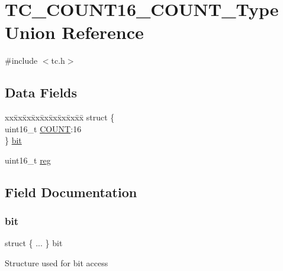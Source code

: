 \hypertarget{union_t_c___c_o_u_n_t16___c_o_u_n_t___type}{}\section{T\+C\+\_\+\+C\+O\+U\+N\+T16\+\_\+\+C\+O\+U\+N\+T\+\_\+\+Type Union Reference}
\label{union_t_c___c_o_u_n_t16___c_o_u_n_t___type}


{\ttfamily \#include $<$tc.\+h$>$}

\subsection*{Data Fields}
\begin{DoxyCompactItemize}
\item 
\begin{tabbing}
xx\=xx\=xx\=xx\=xx\=xx\=xx\=xx\=xx\=\kill
struct \{\\
\>uint16\_t \mbox{\hyperlink{union_t_c___c_o_u_n_t16___c_o_u_n_t___type_a58c1f45ba92b05a410866442e0351978}{COUNT}}:16\\
\} \mbox{\hyperlink{union_t_c___c_o_u_n_t16___c_o_u_n_t___type_a282fa106273ce50da5cf65390daf8e36}{bit}}\\

\end{tabbing}\item 
uint16\+\_\+t \mbox{\hyperlink{union_t_c___c_o_u_n_t16___c_o_u_n_t___type_a11760f5020019f4aa8cb02e694f7cc44}{reg}}
\end{DoxyCompactItemize}


\subsection{Field Documentation}
\mbox{\label{union_t_c___c_o_u_n_t16___c_o_u_n_t___type_a282fa106273ce50da5cf65390daf8e36}} 
\subsubsection{\texorpdfstring{bit}{bit}}
{\footnotesize\ttfamily struct \{ ... \}   bit}

Structure used for bit access \mbox{\label{union_t_c___c_o_u_n_t16___c_o_u_n_t___type_a58c1f45ba92b05a410866442e0351978}} 
